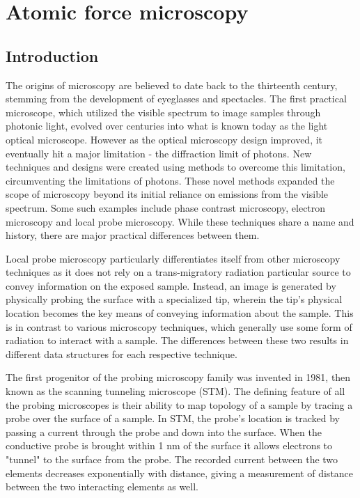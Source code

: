 \chapter{Atomic force microscopy}


\section{Introduction}
The origins of microscopy are believed to date back to the thirteenth century, stemming from the development of eyeglasses and spectacles. The first practical microscope, which utilized the visible spectrum to image samples through photonic light, evolved over centuries into what is known today as the light optical microscope. However as the optical microscopy design improved, it eventually hit a major limitation - the diffraction limit of photons. New techniques and designs were created using methods to overcome this limitation, circumventing the limitations of photons. These novel methods expanded the scope of microscopy beyond its initial reliance on emissions from the visible spectrum. Some such examples include phase contrast microscopy, electron microscopy and local probe microscopy. While these techniques share a name and history, there are major practical differences between them.

Local probe microscopy particularly differentiates itself from other microscopy techniques as it does not rely on a trans-migratory radiation particular source to convey information on the exposed sample. Instead, an image is generated by physically probing the surface with a specialized tip, wherein the tip's physical location becomes the key means of conveying information about the sample. This is in contrast to various microscopy techniques, which generally use some form of radiation to interact with a sample. The differences between these two results in different data structures for each respective technique. \cite{giesbers2001surface}

The first progenitor of the probing microscopy family was invented in 1981, then known as the scanning tunneling microscope (STM). The defining feature of all the probing microscopes is their ability to map topology of a sample by tracing a probe over the surface of a sample. In STM, the probe's location is tracked by passing a current through the probe and down into the surface. When the conductive probe is  brought within 1 nm of the surface it allows electrons to "tunnel" to the surface from the probe. The recorded current between the two elements decreases exponentially with distance, giving a measurement of distance between the two interacting elements as well. 

